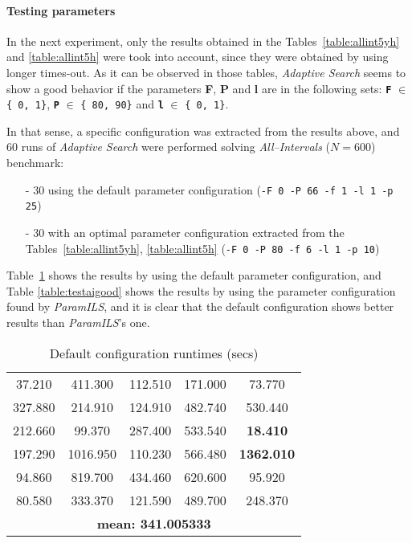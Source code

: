 \paragraph{ Testing parameters}

In the next experiment, only the results obtained in the Tables~\ref{table:allint5yh} and \ref{table:allint5h} were took into account, since they were obtained by using longer times-out. As it can be observed in those tables, {\it Adaptive Search} seems to show a good behavior if the parameters {\bf F}, {\bf P} and {\bf l} are in the following sets: \texttt{\bf F} $\in$ \texttt{\{ 0, 1\}}, \texttt{\bf P} $\in$ \texttt{\{ 80, 90\}} and \texttt{\bf l} $\in$ \texttt{\{ 0, 1\}}.

In that sense, a specific configuration was extracted from the results above, and 60 runs of {\it Adaptive Search} were performed solving {\it All--Intervals} ($N = 600$) benchmark:
\begin{itemize}
	\item[-] 30 using the default parameter configuration (\texttt{-F 0 -P 66 -f 1 -l 1 -p 25})
	\item[-] 30 with an optimal parameter configuration extracted from the Tables~\ref{table:allint5yh}, \ref{table:allint5h} (\texttt{-F 0 -P 80 -f 6 -l 1 -p 10})
\end{itemize}

Table~\ref{table:testaibad} shows the results by using the default parameter configuration, and Table \ref{table:testaigood} shows the results by using the parameter configuration found by {\it ParamILS}, and it is clear that the default configuration shows better results than {\it ParamILS}'s one.

\begin{table}[H]
\caption{Default configuration runtimes (secs)}
\centering
\renewcommand{\arraystretch}{1.2}
\begin{tabular}{|ccccc|}
	\hline
	37.210 & 411.300 & 112.510 & 171.000 & 73.770 \\ 
	327.880 & 214.910 & 124.910 & 482.740 & 530.440 \\  
	\hline 
	212.660 & 99.370 & 287.400 & 533.540 & \textcolor{naranja}{\bf 18.410} \\ 
	197.290 & 1016.950 & 110.230 & 566.480 & \textcolor{intenso}{\bf 1362.010} \\  
	\hline 
	94.860 & 819.700 & 434.460 & 620.600 & 95.920 \\ 
	80.580 & 333.370 & 121.590 & 489.700 & 248.370 \\  
	\hline 
	\multicolumn{5}{|c|}{\bf mean: 341.005333}\\
	\hline
\end{tabular}
\label{table:testaibad}
\end{table}
	
